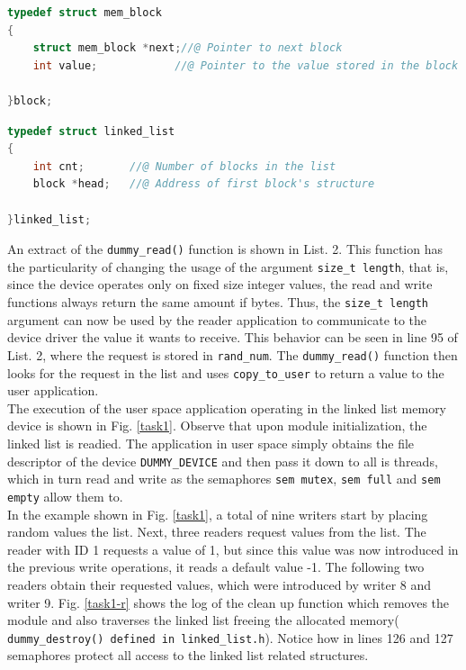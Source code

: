 \documentclass[letterpaper,12pt] {article}
\begin{document}
\begin{lstlisting}[firstnumber = 7 ,language=C  ]
typedef struct mem_block
{
	struct mem_block *next;//@ Pointer to next block 
	int value;            //@ Pointer to the value stored in the block

}block;
\end{lstlisting}

\begin{lstlisting}[firstnumber = 14 ,language=C , caption = Linked list structures (included in \texttt{linked\_list.h})  ]
typedef struct linked_list
{
	int cnt;       //@ Number of blocks in the list
	block *head;   //@ Address of first block's structure

}linked_list;
\end{lstlisting}

An extract of the \texttt{dummy\_read()} function is shown in List. 2. This function has the particularity of changing the usage of the argument \texttt{size\_t length}, that is, since the device operates only on fixed size integer values, the read and write functions always return the same amount if bytes. Thus, the  \texttt{size\_t length} argument can now be used by the reader application to communicate to the device driver the value it wants to receive. This behavior can be seen in line 95 of List. 2, where the request is stored in \texttt{rand\_num}. The \texttt{dummy\_read()} function then looks for the request in the list and uses \texttt{copy\_to\_user} to return a value to the user application.\\

The execution of the user space application operating in the linked list memory device is shown in Fig. \ref{task1}. Observe that upon module initialization, the linked list is readied. The application in user space simply obtains the file descriptor of the device \texttt{DUMMY\_DEVICE} and then pass it down to all is threads, which in turn read and write as the semaphores \texttt{sem mutex}, \texttt{sem full} and \texttt{sem empty} allow them to. \\

In the example shown in Fig. \ref{task1}, a total of nine writers start by placing random values the list. Next, three readers request values from the list. The reader with ID 1 requests a value of 1, but since this value was now introduced in the previous write operations, it reads a default value -1. The following two readers obtain their requested values, which were introduced by writer 8 and writer 9. Fig. \ref{task1-r} shows the log of the clean up function which removes the module and also traverses the linked list freeing the allocated memory( \texttt{dummy\_destroy() defined in \texttt{linked\_list.h}}). Notice how in lines 126 and 127 semaphores protect all access to the linked list related structures.  
\end{document}
